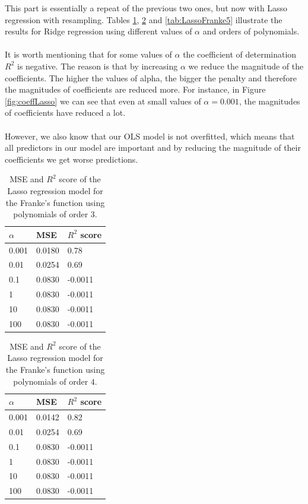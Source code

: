 \documentclass [11pt]{article}
\begin{document}
This part is essentially a repeat of the previous two ones, but now with Lasso regression with resampling. Tables \ref{tab:LassoFranke3}, \ref{tab:LassoFranke4} and \ref{tab:LassoFranke5} illustrate the results for Ridge regression using different values of $\alpha$ and orders of polynomials.\\
\\
It is worth mentioning that for some values of $\alpha$ the coefficient of determination $R^{2}$ is negative. The reason is that by increasing $\alpha$ we reduce the magnitude of the coefficients. The higher the values of alpha, the bigger the penalty and therefore the magnitudes of coefficients are reduced more. For instance, in Figure \ref{fig:coeffLasso} we can see that even at small values of $\alpha=0.001$, the magnitudes of coefficients have reduced a lot.\\
\\
However, we also know that our OLS model is not overfitted, which means that all predictors in our model are important and by reducing the magnitude of their coefficients we get worse predictions. 


\begin{table}[H]
\centering
\begin{tabular}{lll}
\hline
$\alpha$ & MSE    & $R^{2}$ score \\ \hline
0.001     & 0.0180 & 0.78          \\
0.01      & 0.0254 & 0.69          \\
0.1       & 0.0830 & -0.0011       \\
1         & 0.0830 & -0.0011       \\
10        & 0.0830 & -0.0011       \\
100       & 0.0830 & -0.0011       \\ \hline
\end{tabular}
\caption{MSE and $R^{2}$ score of the Lasso regression model for the Franke's function using polynomials of order $3$.}
\label{tab:LassoFranke3}
\end{table}

\begin{table}[H]
\centering
\begin{tabular}{lll}
\hline
$\alpha$ & MSE    & $R^{2}$ score \\ \hline
0.001     & 0.0142 & 0.82          \\
0.01      & 0.0254 & 0.69          \\
0.1       & 0.0830 & -0.0011       \\
1         & 0.0830 & -0.0011       \\
10        & 0.0830 & -0.0011       \\
100       & 0.0830 & -0.0011       \\ \hline
\end{tabular}
\caption{{MSE and $R^{2}$ score of the Lasso regression model for the Franke's function using polynomials of order $4$.}}
\label{tab:LassoFranke4}
\end{table}
\end{document}
